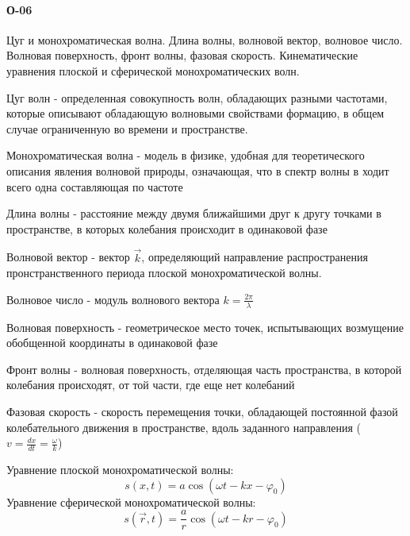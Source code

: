 \documentclass[__main__.tex]{subfiles}
\begin{document}
\paragraph{О-06}
Цуг и монохроматическая волна. Длина волны, волновой вектор, волновое число. Волновая поверхность, фронт волны, фазовая скорость. Кинематические уравнения плоской и сферической монохроматических волн.

\begin{definition}
Цуг волн - определенная совокупность волн, обладающих разными частотами, которые описывают обладающую волновыми свойствами формацию, в общем случае ограниченную во времени и пространстве.
\end{definition}
\begin{definition}
Монохроматическая волна - модель в физике, удобная для теоретического описания явления волновой природы, означающая, что в спектр волны в ходит всего одна составляющая по частоте 
\end{definition}
\begin{definition}
Длина волны - расстояние между двумя ближайшими друг к другу точками в пространстве, в которых колебания происходит в одинаковой фазе
\end{definition}
\begin{definition}
Волновой вектор - вектор $\vec k$, определяющий направление распространения пронстранственного периода плоской монохроматической волны.
\end{definition}
\begin{definition}
Волновое число - модуль волнового вектора $k = \frac{2\pi}{\lambda}$
\end{definition}
\begin{definition}
Волновая поверхность - геометрическое место точек, испытывающих возмущение обобщенной координаты в одинаковой фазе
\end{definition}
\begin{definition}
Фронт волны - волновая поверхность, отделяющая часть пространства, в которой колебания происходят, от той части, где еще нет колебаний
\end{definition}
\begin{definition}
Фазовая скорость - скорость перемещения точки, обладающей постоянной фазой колебательного движения в пространстве, вдоль заданного направления ($v = \frac{dx}{dt} = \frac{\omega}{k}$)
\end{definition}
Уравнение плоской монохроматической волны:
$$s(x, t) = a\cos(\omega t - kx - \varphi_0)$$
Уравнение сферической монохроматической волны:
$$s(\vec r, t) = \frac{a}{r}\cos(\omega t - kr - \varphi_0)$$
\end{document}
